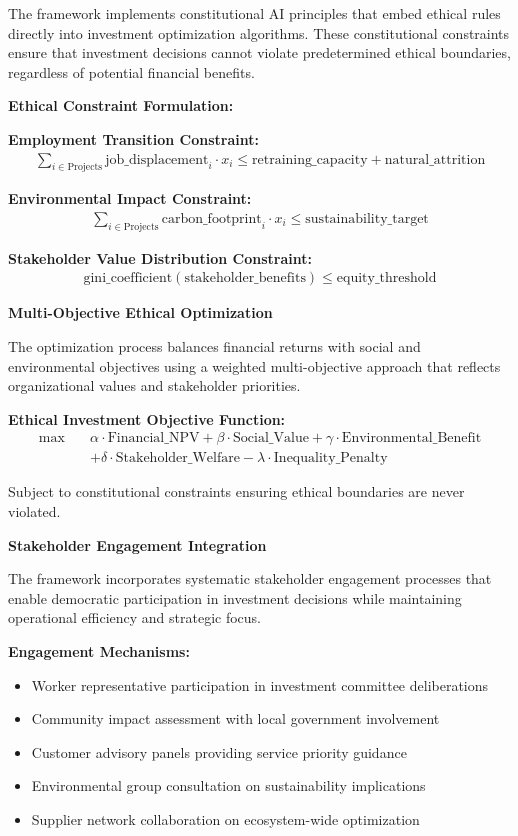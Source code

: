 \documentclass{article}
\begin{document}
The framework implements constitutional AI principles that embed ethical rules directly into investment optimization algorithms. These constitutional constraints ensure that investment decisions cannot violate predetermined ethical boundaries, regardless of potential financial benefits.

\textbf{Ethical Constraint Formulation:}

\textbf{Employment Transition Constraint:}
\begin{align}
\sum_{i \in \text{Projects}} \text{job\_displacement}_{i} \cdot x_i \leq \text{retraining\_capacity} + \text{natural\_attrition}
\end{align}

\textbf{Environmental Impact Constraint:}
\begin{align}
\sum_{i \in \text{Projects}} \text{carbon\_footprint}_{i} \cdot x_i \leq \text{sustainability\_target}
\end{align}

\textbf{Stakeholder Value Distribution Constraint:}
\begin{align}
\text{gini\_coefficient}(\text{stakeholder\_benefits}) \leq \text{equity\_threshold}
\end{align}

\textbf{Multi-Objective Ethical Optimization}

The optimization process balances financial returns with social and environmental objectives using a weighted multi-objective approach that reflects organizational values and stakeholder priorities.

\textbf{Ethical Investment Objective Function:}
\begin{align}
\max \quad &\alpha \cdot \text{Financial\_NPV} + \beta \cdot \text{Social\_Value} + \gamma \cdot \text{Environmental\_Benefit} \\
&+ \delta \cdot \text{Stakeholder\_Welfare} - \lambda \cdot \text{Inequality\_Penalty}
\end{align}

Subject to constitutional constraints ensuring ethical boundaries are never violated.

\textbf{Stakeholder Engagement Integration}

The framework incorporates systematic stakeholder engagement processes that enable democratic participation in investment decisions while maintaining operational efficiency and strategic focus.

\textbf{Engagement Mechanisms:}
\begin{itemize}
\item Worker representative participation in investment committee deliberations
\item Community impact assessment with local government involvement
\item Customer advisory panels providing service priority guidance  
\item Environmental group consultation on sustainability implications
\item Supplier network collaboration on ecosystem-wide optimization
\end{itemize}
\end{document}

